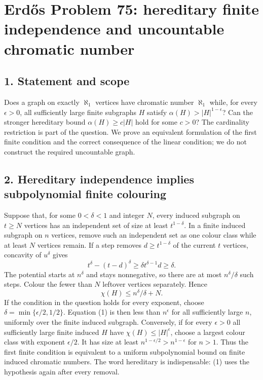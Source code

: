 \section*{Erd\H{o}s Problem 75: hereditary finite independence and uncountable chromatic number}
\subsection*{1. Statement and scope}
Does a graph on exactly $\aleph_1$ vertices have chromatic number $\aleph_1$ while, for every $\epsilon>0$, all sufficiently large finite subgraphs $H$ satisfy $\alpha(H)>|H|^{1-\epsilon}$? Can the stronger hereditary bound $\alpha(H)\ge c|H|$ hold for some $c>0$? The cardinality restriction is part of the question. We prove an equivalent formulation of the first finite condition and the correct consequence of the linear condition; we do not construct the required uncountable graph.

\subsection*{2. Hereditary independence implies subpolynomial finite colouring}
Suppose that, for some $0<\delta<1$ and integer $N$, every induced subgraph on $t\ge N$ vertices has an independent set of size at least $t^{1-\delta}$. In a finite induced subgraph on $n$ vertices, remove such an independent set as one colour class while at least $N$ vertices remain. If a step removes $d\ge t^{1-\delta}$ of the current $t$ vertices, concavity of $u^\delta$ gives
\[
 t^\delta-(t-d)^\delta\ge\delta t^{\delta-1}d\ge\delta.
\]
The potential starts at $n^\delta$ and stays nonnegative, so there are at most $n^\delta/\delta$ such steps. Colour the fewer than $N$ leftover vertices separately. Hence
\[
 \chi(H)\le n^\delta/\delta+N. \tag{1}
\]
If the condition in the question holds for every exponent, choose $\delta=\min\{\epsilon/2,1/2\}$. Equation (1) is then less than $n^\epsilon$ for all sufficiently large $n$, uniformly over the finite induced subgraph.
Conversely, if for every $\epsilon>0$ all sufficiently large finite induced $H$ have $\chi(H)\le |H|^\epsilon$, choose a largest colour class with exponent $\epsilon/2$. It has size at least $n^{1-\epsilon/2}>n^{1-\epsilon}$ for $n>1$. Thus the first finite condition is equivalent to a uniform subpolynomial bound on finite induced chromatic numbers. The word hereditary is indispensable: (1) uses the hypothesis again after every removal.

